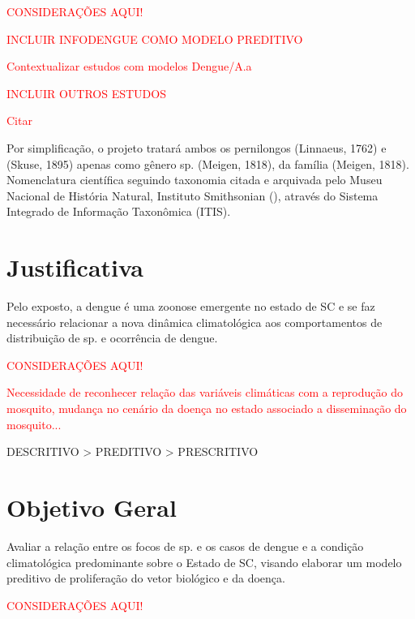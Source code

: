 \begin{center}
\textcolor{red}{CONSIDERAÇÕES AQUI!}
\end{center}
\textcolor{red}{INCLUIR INFODENGUE COMO MODELO PREDITIVO}

\textcolor{red}{Contextualizar estudos com modelos Dengue/A.a}

\textcolor{red}{INCLUIR OUTROS ESTUDOS}

\textcolor{red}{Citar }

\indent Por simplificação, o projeto tratará ambos os pernilongos  (Linnaeus, 1762) e  (Skuse, 1895) apenas como gênero  sp. (Meigen, 1818), da família  (Meigen, 1818). Nomenclatura científica seguindo taxonomia citada e arquivada pelo Museu Nacional de História Natural, Instituto Smithsonian (\citeyear{ITIS}), através do Sistema Integrado de Informação Taxonômica (\acrfull{ITIS}).

\newpage
\section{Justificativa}
\indent Pelo exposto, a dengue é uma zoonose emergente no estado de \acrlong{SC} e se faz necessário relacionar a nova dinâmica climatológica aos comportamentos de distribuição de  sp. e ocorrência de dengue.

\begin{center}
\textcolor{red}{CONSIDERAÇÕES AQUI!}
\end{center}
\textcolor{red}{Necessidade de reconhecer relação das variáveis climáticas com a reprodução do mosquito, mudança no cenário da doença no estado associado a disseminação do mosquito...}

\indent DESCRITIVO > PREDITIVO > PRESCRITIVO
 
 \section{Objetivo Geral}
 Avaliar a relação entre os focos de  sp. e os casos de dengue e a condição climatológica predominante sobre o Estado de \acrlong{SC}, visando elaborar um modelo preditivo de proliferação do vetor biológico e da doença.

\begin{center}
\textcolor{red}{CONSIDERAÇÕES AQUI!}\\ 
\end{center}

